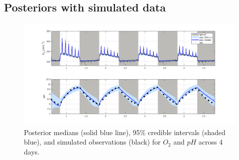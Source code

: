 \documentclass{ruthesis}
\begin{document}
%
%


\FloatBarrier
\subsection{Posteriors with simulated data}


\begin{figure}
	\centerline{\includegraphics[width=1.2\textwidth]{images_microalgae/posterior_plots_with_fake_data/O2_pH}}
	\caption[.]{Posterior medians (solid blue line), 95\% credible intervals (shaded blue), and simulated observations (black) for $O_2$ and $pH$ across 4 days.}
	\label{fig:pos_sim_O2_pH}
\end{figure}
\end{document}
